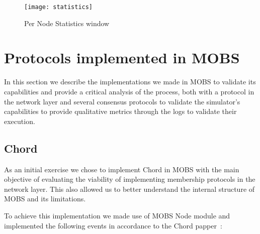 \begin{figure}[h]
	\centering
	\texttt{[image: statistics]}
	\caption{Per Node Statistics window}
	\label{fig:statistics}
\end{figure}

\section{Protocols implemented in MOBS}\label{sub:protocols_implemented_in_mobs}
In this section we describe the implementations we made in MOBS to validate
its capabilities and provide a critical analysis of the process, both with a protocol in
the network layer and several consensus protocols to validate the simulator's capabilities to provide
qualitative metrics through the logs to validate their execution.

\subsection{Chord}\label{sub:chord_implementation}
As an initial exercise we chose to implement Chord in MOBS with the main objective of
evaluating the viability of implementing membership protocols in the network layer. This also
allowed us to better understand the internal structure of MOBS and its limitations.

To achieve this implementation we made use of MOBS Node module and implemented the
following events in accordance to the Chord papper~\cite{chord}:

